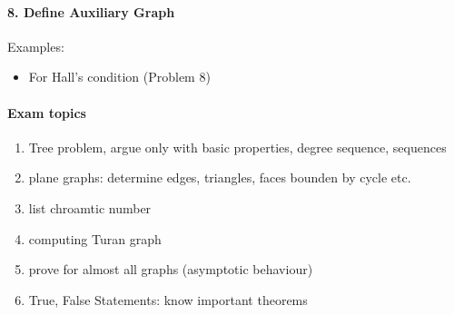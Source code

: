 \documentclass[a4paper]{article}
\begin{document}
\paragraph{8. Define Auxiliary Graph} $ $ \\
Examples:
\begin{itemize}
    \item For Hall's condition (Problem 8) 
\end{itemize}

\paragraph{Exam topics}
\begin{enumerate}
    \item Tree problem, argue only with basic properties, degree sequence, sequences
    \item plane graphs: determine edges, triangles, faces bounden by cycle etc.
    \item list chroamtic number 
    \item computing Turan graph  
    \item prove for almost all graphs (asymptotic behaviour)
    \item True, False Statements: know important theorems
\end{enumerate}
\end{document}
